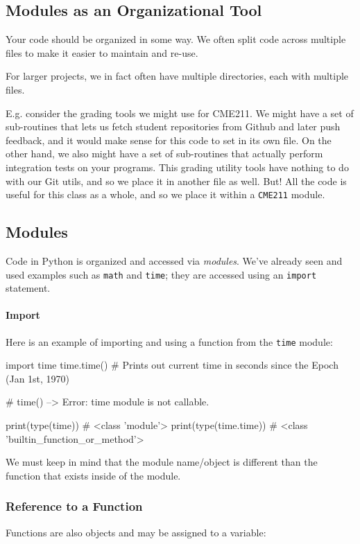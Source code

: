 \documentclass[12pt,letterpaper,twoside]{article}
\begin{document}
\begin{enumerate}
\subsection{Modules as an Organizational Tool} Your code should be organized in some way.
We often split code across multiple files to make it easier to maintain and re-use.

For larger projects, we in fact often have multiple directories, each with multiple files.

E.g. consider the grading tools we might use for CME211. We might have a set of sub-routines that lets
us fetch student repositories from Github and later push feedback, and it would make sense for this code
to set in its own file. On the other hand, we also might have a set of sub-routines that actually
perform integration tests on your programs. This grading utility tools have nothing to do with our Git utils, and so we place it
in another file as well. But! All the code is useful for this class as a whole, and so we place it within a \texttt{CME211} module.

\subsection{Modules} Code in Python is organized and accessed via \emph{modules}. We've already seen and used  examples such as
\texttt{math} and \texttt{time}; they are accessed using an \texttt{import} statement.

\paragraph{Import}
Here is an example of importing and using a function from the
\texttt{time} module:

\begin{python}
import time
time.time()    # Prints out current time in seconds since the Epoch (Jan 1st, 1970)

# time()                --> Error: time module is not callable.

print(type(time))       # <class 'module'>
print(type(time.time))  # <class 'builtin_function_or_method'>

\end{python}
We must keep in mind that the module name/object is different 
than the function that exists inside of the module.

\subsubsection{Reference to a Function}
Functions are also objects and may be assigned to a variable:


\end{enumerate}
\end{document}
